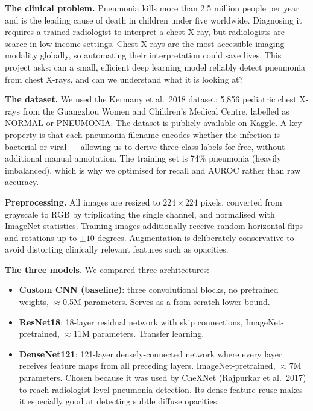 \documentclass[12pt,a4paper]{article}
\begin{document}
\begin{tcolorbox}[sumbox={What This Project Is About — A Complete Overview}]
\textbf{The clinical problem.}
Pneumonia kills more than 2.5 million people per year and is the leading cause of death in children under five worldwide. Diagnosing it requires a trained radiologist to interpret a chest X-ray, but radiologists are scarce in low-income settings. Chest X-rays are the most accessible imaging modality globally, so automating their interpretation could save lives. This project asks: can a small, efficient deep learning model reliably detect pneumonia from chest X-rays, and can we understand what it is looking at?

\medskip
\textbf{The dataset.}
We used the Kermany et al.\ 2018 dataset: 5,856 pediatric chest X-rays from the Guangzhou Women and Children's Medical Centre, labelled as NORMAL or PNEUMONIA. The dataset is publicly available on Kaggle. A key property is that each pneumonia filename encodes whether the infection is bacterial or viral --- allowing us to derive three-class labels for free, without additional manual annotation. The training set is 74\% pneumonia (heavily imbalanced), which is why we optimised for recall and AUROC rather than raw accuracy.

\medskip
\textbf{Preprocessing.}
All images are resized to $224 \times 224$ pixels, converted from grayscale to RGB by triplicating the single channel, and normalised with ImageNet statistics. Training images additionally receive random horizontal flips and rotations up to $\pm 10$ degrees. Augmentation is deliberately conservative to avoid distorting clinically relevant features such as opacities.

\medskip
\textbf{The three models.}
We compared three architectures:
\begin{itemize}[nosep]
  \item \textbf{Custom CNN (baseline)}: three convolutional blocks, no pretrained weights, $\approx$0.5M parameters. Serves as a from-scratch lower bound.
  \item \textbf{ResNet18}: 18-layer residual network with skip connections, ImageNet-pretrained, $\approx$11M parameters. Transfer learning.
  \item \textbf{DenseNet121}: 121-layer densely-connected network where every layer receives feature maps from all preceding layers. ImageNet-pretrained, $\approx$7M parameters. Chosen because it was used by CheXNet (Rajpurkar et al.\ 2017) to reach radiologist-level pneumonia detection. Its dense feature reuse makes it especially good at detecting subtle diffuse opacities.
\end{itemize}


\end{tcolorbox}
\end{document}
